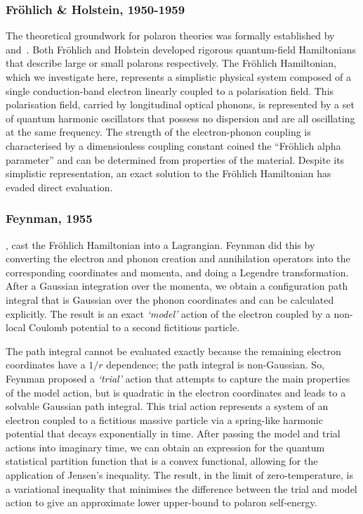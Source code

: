 \subsubsection{Fr\"ohlich \& Holstein, 1950-1959}
\label{subsubsec:2-1-1-2}

The theoretical groundwork for polaron theories was formally established by~\cite{frohlich_electrons_1954} and~\cite{holstein_studies_1959-1, holstein_studies_1959}. Both Fr\"ohlich and Holstein developed rigorous quantum-field Hamiltonians that describe large or small polarons respectively. The Fr\"ohlich Hamiltonian, which we investigate here, represents a simplistic physical system composed of a single conduction-band electron linearly coupled to a polarisation field. This polarisation field, carried by longitudinal optical phonons, is represented by a set of quantum harmonic oscillators that possess no dispersion and are all oscillating at the same frequency. The strength of the electron-phonon coupling is characterised by a dimensionless coupling constant coined the ``Fr\"ohlich alpha parameter'' and can be determined from properties of the material. Despite its simplistic representation, an exact solution to the Fr\"ohlich Hamiltonian has evaded direct evaluation.

\subsubsection{Feynman, 1955}
\label{subsubsec:2-1-1-3}

\cite{feynman_slow_1955}, cast the Fr\"ohlich Hamiltonian into a Lagrangian. Feynman did this by converting the electron and phonon creation and annihilation operators into the corresponding coordinates and momenta, and doing a Legendre transformation. After a Gaussian integration over the momenta, we obtain a configuration path integral that is Gaussian over the phonon coordinates and can be calculated explicitly. The result is an exact \emph{`model'} action of the electron coupled by a non-local Coulomb potential to a second fictitious particle. 

The path integral cannot be evaluated exactly because the remaining electron coordinates have a $1 / r$ dependence; the path integral is non-Gaussian. So, Feynman proposed a \emph{`trial'} action that attempts to capture the main properties of the model action, but is quadratic in the electron coordinates and leads to a solvable Gaussian path integral. This trial action represents a system of an electron coupled to a fictitious massive particle via a spring-like harmonic potential that decays exponentially in time. After passing the model and trial actions into imaginary time, we can obtain an expression for the quantum statistical partition function that is a convex functional, allowing for the application of Jensen's inequality. The result, in the limit of zero-temperature, is a variational inequality that minimises the difference between the trial and model action to give an approximate lower upper-bound to polaron self-energy.

